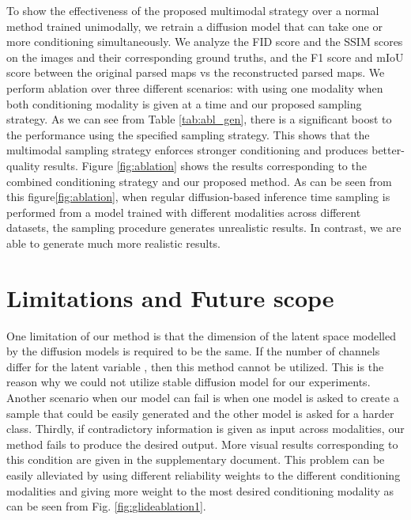 \documentclass[10pt,twocolumn,letterpaper]{article}
\begin{document}
\begin{table}[t!]
\centering
{}
\caption{Analyzing advantage of the proposed sampling method over normal training and regular sampling techniques.}
\label{tab:abl_gen}
\vspace{-8mm}
\end{table}
 To show the effectiveness of the proposed multimodal strategy over a normal method trained unimodally, we retrain a diffusion model that can take one or more conditioning simultaneously. We analyze the FID score and the SSIM scores on the images and their corresponding ground truths,  and the F1 score and mIoU score between the original parsed maps vs the reconstructed parsed maps. We perform ablation over three different scenarios: with using one modality when both conditioning modality is given at a time and our proposed sampling strategy. As we can see from Table \ref{tab:abl_gen}, there is a significant boost to the performance using the specified sampling strategy. This shows that the multimodal sampling strategy enforces stronger conditioning and produces better-quality results. Figure \ref{fig:ablation} shows the results corresponding to the combined conditioning strategy and our proposed method. As can be seen from this figure\ref{fig:ablation}, when regular diffusion-based inference time sampling is performed from a model trained with different modalities across different datasets, the sampling procedure generates unrealistic results. In contrast, we are able to generate much more realistic results.

\section{Limitations and Future scope}


One limitation of our method is that the dimension of the latent space modelled by the diffusion models is required to be the same. If the number of channels differ for the latent variable , then this method cannot be utilized. This is the reason why we could not utilize stable diffusion model \cite{rombach2022high} for our experiments. Another scenario when our model can fail is when one model is asked to create a sample that could be easily generated and the other model is asked for a harder class. Thirdly, if contradictory information is given as input across modalities, our method fails to produce the desired output. More visual results corresponding to this condition are given in the supplementary document. This problem can be easily alleviated by using different reliability weights to the different conditioning modalities and giving more weight to the most desired conditioning modality as can be seen from Fig.  \ref{fig:glideablation1}. 
\end{document}
